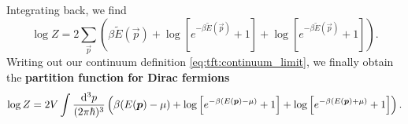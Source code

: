 Integrating back, we find
\begin{equation}
	\log Z = 2 \sum_\vec{p} \left( \beta \tilde E(\vec{p}) + \log\left[ e^{-\beta \tilde E(\vec{p})}+1 \right] + \log\left[ e^{-\beta \tilde E(\vec{p})} + 1\right] \right) .
\end{equation}
Writing out our continuum definition \eqref{eq:tft:continuum_limit}, we finally obtain the \textbf{partition function for Dirac fermions}
\begin{equation}
	\log Z = 2 V \int \frac{\mathop{}\!\mathrm{d}^3 p}{(2 \pi \hbar)^3} \left( \beta (E({\bm{p}}) - \mu) + \log\left[ e^{-\beta (E({\bm{p}}) - \mu)}+1 \right] + \log\left[ e^{-\beta (E({\bm{p}}) + \mu)} + 1\right] \right) .
\label{eq:tft:dirac_partition_function}
\end{equation}
